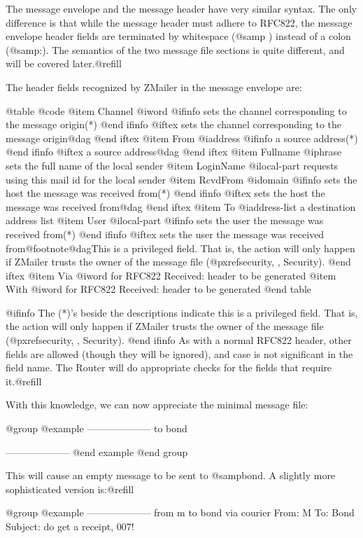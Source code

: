 The message envelope and the message header have very similar syntax.
The only difference is that while the message header must adhere to
RFC822, the message envelope header fields are terminated by whitespace
(@samp{ }) instead of a colon (@samp{:}).  The semantics of the two
message file sections is quite different, and will be covered
later.@refill

The header fields recognized by ZMailer in the message envelope are:

@table @code
@item Channel @i{word}
@ifinfo
sets the channel corresponding to the message origin(*)
@end ifinfo
@iftex
sets the channel corresponding to the message origin@dag{}
@end iftex
@item From @i{address}
@ifinfo
a source address(*)
@end ifinfo
@iftex
a source address@dag{}
@end iftex
@item Fullname @i{phrase}
sets the full name of the local sender
@item LoginName @i{local-part}
requests using this mail id for the local sender
@item RcvdFrom @i{domain}
@ifinfo
sets the host the message was received from(*)
@end ifinfo
@iftex
sets the host the message was received from@dag{}
@end iftex
@item To @i{address-list}
a destination address list
@item User @i{local-part}
@ifinfo
sets the user the message was received from(*)
@end ifinfo
@iftex
sets the user the message was received from@footnote{@dag}{This
is a privileged field.  That is, the action will only
happen if ZMailer trusts the owner of the message file
(@pxref{security, , Security}).}
@end iftex
@item Via @i{word}
for RFC822 Received: header to be generated
@item With @i{word}
for RFC822 Received: header to be generated
@end table

@ifinfo
The (*)'s beside the descriptions indicate this is a privileged field.  That
is, the action will only happen if ZMailer trusts the owner of the message
file (@pxref{security, , Security}).
@end ifinfo
As with a normal RFC822 header, other fields are allowed
(though they will be ignored), and case is not significant in the field name.
The Router will do appropriate checks for the fields that require it.@refill

With this knowledge, we can now appreciate the minimal message file:

@group
@example
--------------------
to bond

--------------------
@end example
@end group

This will cause an empty message to be sent to @samp{bond}.
A slightly more sophisticated version is:@refill

@group
@example
--------------------
from m
to bond
via courier
From: M
To: Bond
Subject: do get a receipt, 007!


